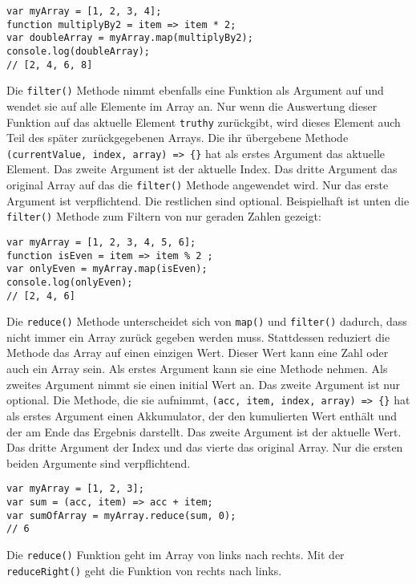 \documentclass{book}
\begin{document}
\begin{lstlisting}[caption=Array Konstruktor]
var myArray = [1, 2, 3, 4];
function multiplyBy2 = item => item * 2;
var doubleArray = myArray.map(multiplyBy2);
console.log(doubleArray);
// [2, 4, 6, 8]
\end{lstlisting}

Die \lstinline|filter()| Methode nimmt ebenfalls eine Funktion als Argument auf und wendet sie auf alle Elemente im Array an. Nur wenn die Auswertung dieser Funktion auf das aktuelle Element \lstinline|truthy| zurückgibt, wird dieses Element auch Teil des später zurückgegebenen Arrays. Die ihr übergebene Methode \lstinline|(currentValue, index, array) => {}| hat als erstes Argument das aktuelle Element. Das zweite Argument ist der aktuelle Index. Das dritte Argument das original Array auf das die \lstinline|filter()| Methode angewendet wird. Nur das erste Argument ist verpflichtend. Die restlichen sind optional. Beispielhaft ist unten die \lstinline|filter()| Methode zum Filtern von nur geraden Zahlen gezeigt:

\begin{lstlisting}[caption=Array Konstruktor]
var myArray = [1, 2, 3, 4, 5, 6];
function isEven = item => item % 2 ;
var onlyEven = myArray.map(isEven);
console.log(onlyEven);
// [2, 4, 6]
\end{lstlisting}

Die \lstinline|reduce()| Methode unterscheidet sich von \lstinline|map()| und \lstinline|filter()| dadurch, dass nicht immer ein Array zurück gegeben werden muss. Stattdessen reduziert die Methode das Array auf einen einzigen Wert. Dieser Wert kann eine Zahl oder auch ein Array sein. Als erstes Argument kann sie eine Methode nehmen. Als zweites Argument nimmt sie einen initial Wert an. Das zweite Argument ist nur optional. Die Methode, die sie aufnimmt, \lstinline|(acc, item, index, array) => {}| hat als erstes Argument einen Akkumulator, der den kumulierten Wert enthält und der am Ende das Ergebnis darstellt. Das zweite Argument ist der aktuelle Wert. Das dritte Argument der Index und das vierte das original Array. Nur die ersten beiden Argumente sind verpflichtend.

\begin{lstlisting}[caption=Array Konstruktor]
var myArray = [1, 2, 3];
var sum = (acc, item) => acc + item;
var sumOfArray = myArray.reduce(sum, 0);
// 6
\end{lstlisting}

Die \lstinline|reduce()| Funktion geht im Array von links nach rechts. Mit der \lstinline|reduceRight()| geht die Funktion von rechts nach links.
\end{document}
